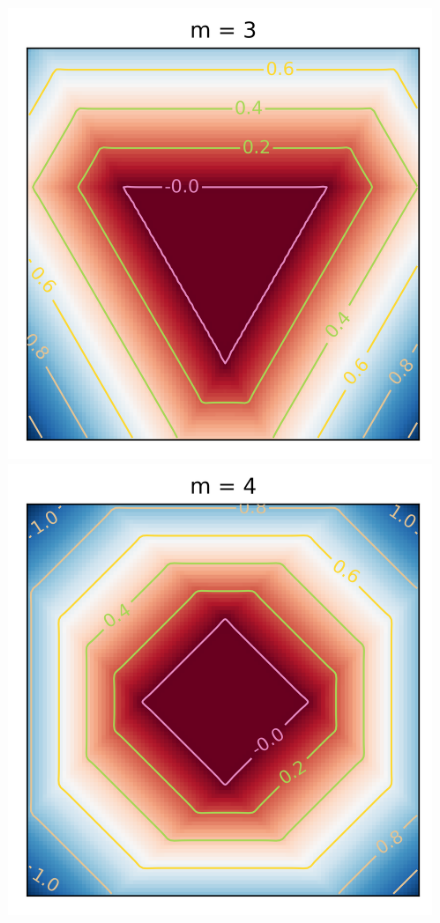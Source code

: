 \documentclass{article} %
\begin{document}
\begin{figure}[h]
\begin{center}
\includegraphics[scale=0.4]{truedist3.png}
\includegraphics[scale=0.4]{truedist4.png}

\end{center}
\end{figure}
\end{document}
